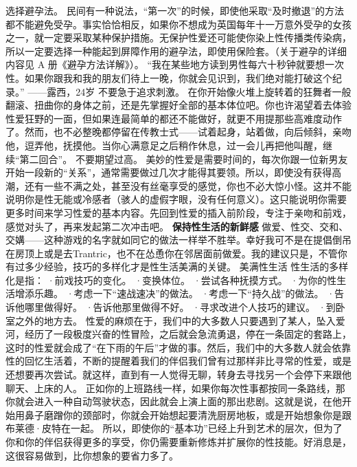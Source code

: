 \documentclass[12pt,UTF8,openany]{ctexbook}
\begin{document}
选择避孕法。
民间有一种说法，“第一次”的时候，即使他采取“及时撤退”的方法都不能避免受孕。事实恰恰相反，如果你不想成为英国每年十一万意外受孕的女孩之一，就一定要采取某种保护措施。无保护性爱还可能使你染上性传播类传染病，所以一定要选择一种能起到屏障作用的避孕法，即使用保险套。（关于避孕的详细内容见 A 册《避孕方法详解》）。
“我在某些地方读到男性每六十秒钟就要想一次性。如果你跟我和我的朋友们待上一晚，你就会见识到，我们绝对能打破这个纪录。”
——露西，24岁
不要急于追求刺激。
在你开始像火堆上旋转着的狂舞者一般翻滚、扭曲你的身体之前，还是先掌握好全部的基本体位吧。你也许渴望着去体验性爱狂野的一面，但如果连最简单的都还不能做好，就更不用提那些高难度动作了。然而，也不必整晚都停留在传教士式——试着起身，站着做，向后倾斜，亲吻他，逗弄他，抚摸他。当你心满意足之后稍作休息，过一会儿再把他叫醒，继续“第二回合”。
不要期望过高。
美妙的性爱是需要时间的，每次你跟一位新男友开始一段新的“关系”，通常需要做过几次才能得其要领。所以，即使没有获得高潮，还有一些不满之处，甚至没有丝毫享受的感觉，你也不必大惊小怪。这并不能说明你是性无能或冷感者（骇人的虚假字眼，没有任何意义）。这只能说明你需要更多时间来学习性爱的基本内容。先回到性爱的插入前阶段，专注于亲吻和前戏，感觉对头了，再来发起第二次冲击吧。
\textbf{保持性生活的新鲜感}
做爱、性交、交和、交媾——这种游戏的名字就如同它的做法一样举不胜举。幸好我可不是在提倡倒吊在房顶上或是去Trantric，也不在怂恿你在邻居面前做爱。我的建议只是，不管你有过多少经验，技巧的多样化才是性生活美满的关键。
美满性生活
性生活的多样化是指：
·前戏技巧的变化。
·变换体位。
·尝试各种抚摸方式。
·为你的性生活增添乐趣。
·考虑一下“速战速决”的做法。
·考虑一下“持久战”的做法。
·告诉他哪里做得好。
·告诉他那里做得不好。
·寻求改进个人技巧的建议。
·到卧室之外的地方去。
性爱的麻烦在于，我们中的大多数人只要遇到了某人，坠入爱河，经历了一段极度兴奋的性冒险，之后就会急流勇退，停在一条固定的套路上，这时的性爱就会成了“在下雨的午后”才做的事。然后，我们中的大多数人就会依靠性的回忆生活着，不断的提醒着我们的伴侣我们曾有过那样非比寻常的性爱，或是还想要再次尝试。就这样，直到有一人觉得无聊，转身去寻找另一个会停下来跟他聊天、上床的人。
正如你的上班路线一样，如果你每次性事都按同一条路线，那你就会进入一种自动驾驶状态，因此就会上演上面的那出悲剧。这就是说，在他开始用鼻子磨蹭你的颈部时，你就会开始想起要清洗厨房地板，或是开始想象你是跟布莱德·皮特在一起。
所以，即使你的“基本功”已经上升到艺术的层次，但为了你和你的伴侣获得更多的享受，你仍需要重新修炼并扩展你的性技能。好消息是，这很容易做到，比你想象的要省力多了。
\end{document}
